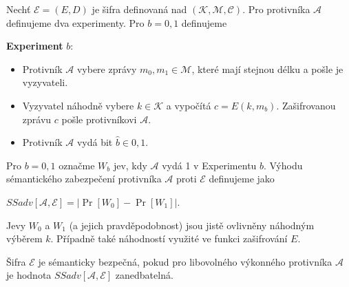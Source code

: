 \documentclass[
  program=infoi,
  biblatex,
  figures=false,
  glossaries,
  index
]{kidiplom}
\begin{document}
        \begin{definition}\label{def:semantic-security-attack-game}
            
            Nechť $\mathcal{E}  = (E, D)$ je šifra definovaná nad $(\mathcal{K},\mathcal{M},\mathcal{C})$.
            Pro protivníka $\mathcal{A}$ definujeme dva experimenty. Pro $b = 0, 1$ definujeme

            \medskip

            \textbf{Experiment} $b$:

            \begin{itemize}
                \item 
                    Protivník $\mathcal{A}$ vybere zprávy $m_0, m_1 \in \mathcal{M}$, které mají stejnou délku a pošle je vyzyvateli.
                \item
                    Vyzyvatel náhodně vybere $k \in \mathcal{K}$ a vypočítá $c = E(k, m_b)$.
                    Zašifrovanou zprávu $c$ pošle protivníkovi $\mathcal{A}$.
                \item
                    Protivník $\mathcal{A}$ vydá bit $\hat{b} \in {0,1}$.
            \end{itemize}

            Pro $b = 0, 1$ označme $W_b$ jev, kdy $\mathcal{A}$ vydá 1 v Experimentu $b$.
            Výhodu sémantického zabezpečení protivníka $\mathcal{A}$ proti $\mathcal{E}$ definujeme jako

            \begin{center}
                $SSadv[\mathcal{A}, \mathcal{E}] = \left\lvert\Pr[W_0] - \Pr[W_1]\right\rvert$.
            \end{center}

        \end{definition}

        \begin{remark}
            Jevy $W_0$ a $W_1$ (a jejich pravděpodobnost) jsou jistě ovlivněny náhodným výběrem $k$.
            Případně také náhodností využité ve funkci zašifrování $E$.
        \end{remark}

        \begin{definition}\label{def:semantic-security}
            Šifra $\mathcal{E}$ je sémanticky bezpečná, pokud pro libovolného výkonného protivníka $\mathcal{A}$
            je hodnota $SSadv[\mathcal{A}, \mathcal{E}]$ zanedbatelná.
        \end{definition}
\end{document}
